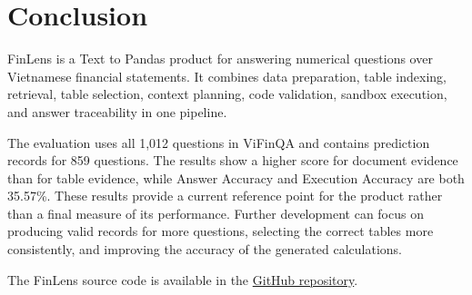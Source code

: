 \documentclass[10pt,journal,compsoc]{IEEEtran}
\begin{document}
\section{Conclusion}
FinLens is a Text to Pandas product for answering numerical questions over Vietnamese financial statements. It combines data preparation, table indexing, retrieval, table selection, context planning, code validation, sandbox execution, and answer traceability in one pipeline.

The evaluation uses all 1,012 questions in ViFinQA and contains prediction records for 859 questions. The results show a higher score for document evidence than for table evidence, while Answer Accuracy and Execution Accuracy are both 35.57\%. These results provide a current reference point for the product rather than a final measure of its performance. Further development can focus on producing valid records for more questions, selecting the correct tables more consistently, and improving the accuracy of the generated calculations.

The FinLens source code is available in the \href{https://github.com/tlong-ds/finlens-ai}{GitHub repository}.



\end{document}
